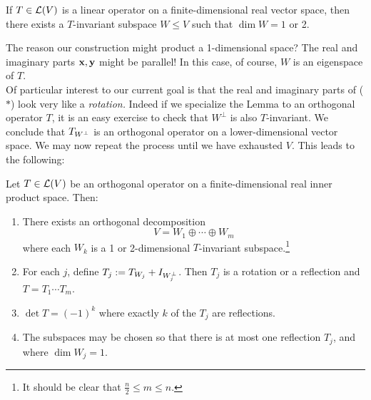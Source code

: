 \begin{lemm}{}{}
If $T\in\mathcal{L}(V)$ is a linear operator on a finite-dimensional real vector space, then there exists a $T$-invariant subspace $W\le V$ such that $\dim W=1$ or 2.
\end{lemm}

The reason our construction might product a 1-dimensional space? The real and imaginary parts ${\mathbf{x}},{\mathbf{y}}$ might be parallel! In this case, of course, $W$ is an eigenspace of $T$.\\

Of particular interest to our current goal is that the real and imaginary parts of ($\ast$) look very like a \emph{rotation.} Indeed if we specialize the Lemma to an orthogonal operator $T$, it is an easy exercise to check that $W^\perp$ is also $T$-invariant. We conclude that $T_{W^\perp}$ is an orthogonal operator on a lower-dimensional vector space. We may now repeat the process until we have exhausted $V$. This leads to the following:

\begin{thm}{}{}
Let $T\in\mathcal{L}(V)$ be an orthogonal operator on a finite-dimensional real inner product space. Then:
\begin{enumerate}
  \item There exists an orthogonal decomposition
	\[V= W_1\oplus\cdots \oplus W_m\]
	where each $W_k$ is a 1 or 2-dimensional $T$-invariant subspace.\footnote{It should be clear that $\frac n2\le m\le n$.}
	\item For each $j$, define $T_j:=T_{W_j}+I_{W_j^\perp}$. Then $T_j$ is a rotation or a reflection and $T=T_1\cdots T_m$.
	\item $\det T=(-1)^k$ where exactly $k$ of the $T_j$ are reflections.
	\item The subspaces may be chosen so that there is at most one reflection $T_j$, and where $\dim W_j=1$.
\end{enumerate}
\end{thm}

